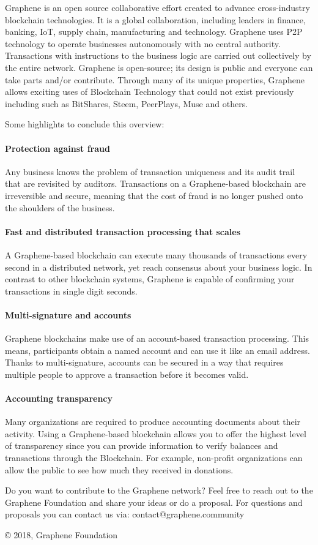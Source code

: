 Graphene is an open source collaborative effort created to advance
cross-industry blockchain technologies. It is a global collaboration,
including leaders in finance, banking, IoT, supply chain, manufacturing
and technology.
Graphene uses P2P technology to operate businesses autonomously
with no central authority. Transactions with instructions to the
business logic are carried out collectively by the entire network.
Graphene is open-source; its design is public and everyone can take
parts and/or contribute. Through many of its unique properties, Graphene allows exciting
uses of Blockchain Technology that could not exist previously including
such as BitShares, Steem, PeerPlays, Muse and others.

Some highlights to conclude this overview:

\paragraph{Protection against fraud}
Any business knows the problem of transaction uniqueness and its audit
trail that are revisited by auditors. Transactions on a Graphene-based
blockchain are irreversible and secure, meaning that the cost of fraud
is no longer pushed onto the shoulders of the business.

\paragraph{Fast and distributed transaction processing that scales}
A Graphene-based blockchain can execute many thousands of transactions
every second in a distributed network, yet reach consensus about your
business logic. In contrast to other blockchain systems, Graphene is
capable of confirming your transactions in single digit seconds.

\paragraph{Multi-signature and accounts}
Graphene blockchains make use of an account-based transaction
processing. This means, participants obtain a named account and can use
it like an email address. Thanks to multi-signature, accounts can be
secured in a way that requires multiple people to approve a transaction
before it becomes valid.

\paragraph{Accounting transparency}
Many organizations are required to produce accounting documents about
their activity. Using a Graphene-based blockchain allows you to offer
the highest level of transparency since you can provide information to
verify balances and transactions through the Blockchain. For example,
non-profit organizations can allow the public to see how much they
received in donations.



Do you want to contribute to the Graphene network? Feel free to reach out to the Graphene Foundation and share your ideas or do a proposal. For questions and proposals you can contact us via: contact@graphene.community
 
 © 2018, Graphene Foundation
